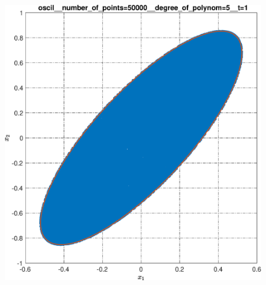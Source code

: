 \documentclass[../main.tex]{subfiles}
\begin{document}
\begin{figure}[ht!]
\begin{minipage}[b]{.3\linewidth}
  		\label{fig:ap:oscilN5104k1T2pi}
  	\end{minipage} 
  	\vfill
  	\hspace{-2.5ex}
  	\begin{minipage}[b]{.3\linewidth} 
  		\small
  		\centering 
  		\includegraphics[width=\linewidth]{images/oscil__number_of_points=50000__degree_of_polynom=5__t=1.eps}
  	\end{minipage}
  	\hfill
  	\begin{minipage}[b]{.3\linewidth} 
  		\small
  		\centering

\end{minipage}
\end{figure}
\end{document}
